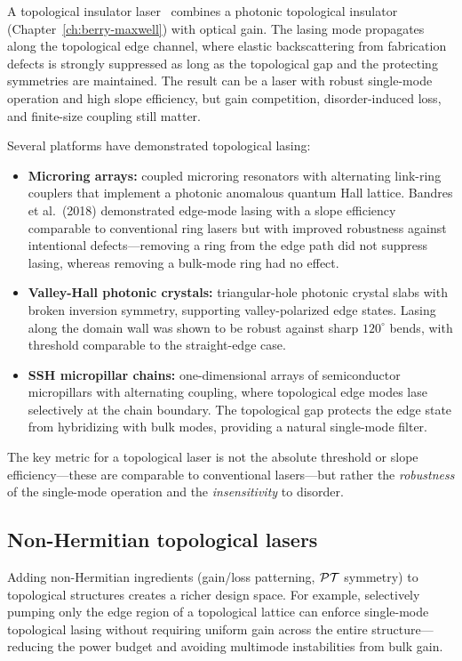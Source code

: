 A topological insulator laser~\cite{bandres2018topological,harari2018topological} combines a photonic topological insulator
(Chapter~\ref{ch:berry-maxwell}) with optical gain. The lasing mode
propagates along the topological edge channel, where elastic
backscattering from fabrication defects is strongly suppressed as long as the
topological gap and the protecting symmetries are maintained. The result
can be a laser with robust single-mode operation and high slope
efficiency, but gain competition, disorder-induced loss, and finite-size
coupling still matter.

Several platforms have demonstrated topological lasing:
\begin{itemize}
 \item \textbf{Microring arrays:} coupled microring resonators with
 alternating link-ring couplers that implement a photonic
 anomalous quantum Hall lattice. Bandres et al.\ (2018)
 demonstrated edge-mode lasing with a slope efficiency comparable
 to conventional ring lasers but with improved
 robustness against intentional defects---removing a ring from the
 edge path did not suppress lasing, whereas removing a bulk-mode
 ring had no effect.
 \item \textbf{Valley-Hall photonic crystals:} triangular-hole
 photonic crystal slabs with broken inversion symmetry, supporting
 valley-polarized edge states. Lasing along the domain wall was
 shown to be robust against sharp $120^\circ$ bends, with
 threshold comparable to the straight-edge case.
 \item \textbf{SSH micropillar chains:} one-dimensional arrays of
 semiconductor micropillars with alternating coupling, where
 topological edge modes lase selectively at the chain boundary.
 The topological gap protects the edge state from hybridizing
 with bulk modes, providing a natural single-mode filter.
\end{itemize}

The key metric for a topological laser is not the absolute threshold or
slope efficiency---these are comparable to conventional lasers---but
rather the \emph{robustness} of the single-mode operation and the
\emph{insensitivity} to disorder.

\subsection{Non-Hermitian topological lasers}
\label{ssec:nh-topo-laser}

Adding non-Hermitian ingredients (gain/loss patterning, $\mathcal{PT}$ symmetry)
to topological structures creates a richer design space. For example,
selectively pumping only the edge region of a topological lattice can
enforce single-mode topological lasing without requiring uniform gain
across the entire structure---reducing the power budget and avoiding
multimode instabilities from bulk gain.

